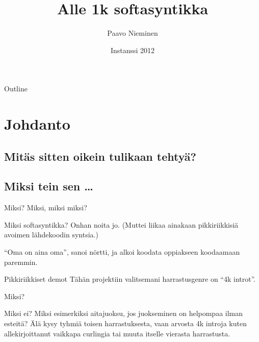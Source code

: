 \documentclass{beamer}
\title%
{Alle 1k softasyntikka}
\author{Paavo Nieminen}
\date{Instanssi 2012}
\begin{document}
\begin{frame}
  \titlepage
\end{frame}

\begin{frame}{Outline}
  \tableofcontents
\end{frame}






\section{Johdanto}

\subsection{Mitäs sitten oikein tulikaan tehtyä?}

\subsection{Miksi tein sen \ldots}
\begin{frame}{Miksi? Miksi, miksi miksi?}

  Miksi softasyntikka? Onhan noita jo. (Muttei liikaa ainakaan
  pikkiriikkisiä avoimen lähdekoodin syntsia.)

  ``Oma on aina oma'', sanoi nörtti, ja alkoi koodata oppiakseen
  koodaamaan paremmin.

\end{frame}

\begin{frame}{Pikkiriikkiset demot}
  Tähän projektiin valitsemani harrastusgenre on ``4k introt''.

  Miksi?

  Miksi ei? Miksi esimerkiksi aitajuoksu, jos juokseminen on helpompaa
  ilman esteitä? Älä kysy tyhmiä toisen harrastuksesta, vaan arvosta
  4k introja kuten allekirjoittanut vaikkapa curlingia tai muuta
  itselle vierasta harrastusta.
\end{frame}
\end{document}
